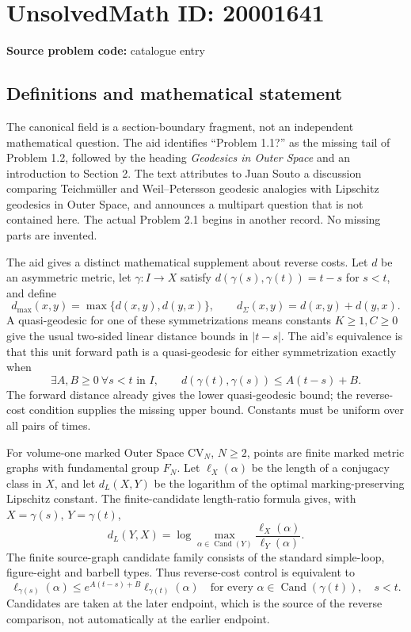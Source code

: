 \documentclass[11pt]{article}
\begin{document}
\section*{UnsolvedMath ID: 20001641}
\textbf{Source problem code:} catalogue entry
\subsection{Definitions and mathematical statement}
The canonical field is a section-boundary fragment, not an independent mathematical question. The aid identifies ``Problem 1.1?'' as the missing tail of Problem 1.2, followed by the heading \emph{Geodesics in Outer Space} and an introduction to Section 2. The text attributes to Juan Souto a discussion comparing Teichm\"uller and Weil--Petersson geodesic analogies with Lipschitz geodesics in Outer Space, and announces a multipart question that is not contained here. The actual Problem 2.1 begins in another record. No missing parts are invented.

The aid gives a distinct mathematical supplement about reverse costs. Let \(d\) be an asymmetric metric, let \(\gamma:I\to X\) satisfy \(d(\gamma(s),\gamma(t))=t-s\) for \(s<t\), and define
\[
d_{\max}(x,y)=\max\{d(x,y),d(y,x)\},\qquad
 d_{\Sigma}(x,y)=d(x,y)+d(y,x).
\]
A quasi-geodesic for one of these symmetrizations means constants \(K\ge1,C\ge0\) give the usual two-sided linear distance bounds in \(|t-s|\). The aid's equivalence is that this unit forward path is a quasi-geodesic for either symmetrization exactly when
\[
\exists A,B\ge0\ \forall s<t\text{ in }I,\qquad
 d(\gamma(t),\gamma(s))\le A(t-s)+B.
\]
The forward distance already gives the lower quasi-geodesic bound; the reverse-cost condition supplies the missing upper bound. Constants must be uniform over all pairs of times.

For volume-one marked Outer Space \(\mathrm{CV}_N\), \(N\ge2\), points are finite marked metric graphs with fundamental group \(F_N\). Let \(\ell_X(\alpha)\) be the length of a conjugacy class in \(X\), and let \(d_L(X,Y)\) be the logarithm of the optimal marking-preserving Lipschitz constant. The finite-candidate length-ratio formula gives, with \(X=\gamma(s)\), \(Y=\gamma(t)\),
\[
d_L(Y,X)=\log\max_{\alpha\in\operatorname{Cand}(Y)}\frac{\ell_X(\alpha)}{\ell_Y(\alpha)}.
\]
The finite source-graph candidate family consists of the standard simple-loop, figure-eight and barbell types. Thus reverse-cost control is equivalent to
\[
\ell_{\gamma(s)}(\alpha)\le e^{A(t-s)+B}\ell_{\gamma(t)}(\alpha)
\quad\text{for every }\alpha\in\operatorname{Cand}(\gamma(t)),\quad s<t.
\]
Candidates are taken at the later endpoint, which is the source of the reverse comparison, not automatically at the earlier endpoint.
\end{document}
